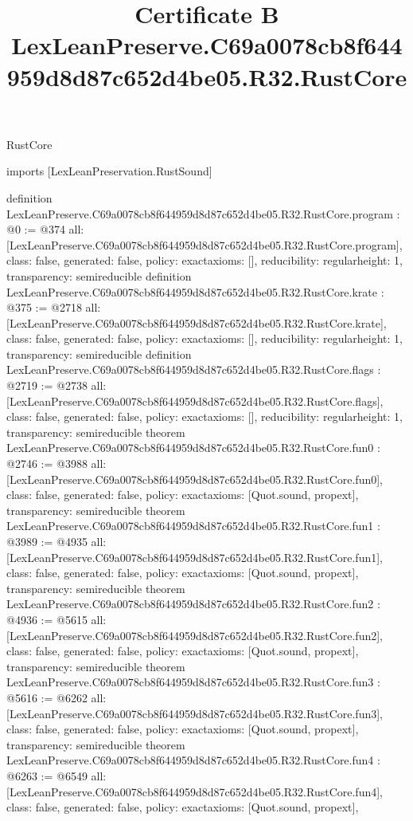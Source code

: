 \begin{lexlean}{RustCore}
\title{Certificate B LexLeanPreserve.C69a0078cb8f644959d8d87c652d4be05.R32.RustCore}
\begin{coremodule}
imports [LexLeanPreservation.RustSound]

definition LexLeanPreserve.C69a0078cb8f644959d8d87c652d4be05.R32.RustCore.program : @0 := @374 {
  all: [LexLeanPreserve.C69a0078cb8f644959d8d87c652d4be05.R32.RustCore.program],
  class: false,
  generated: false,
  policy: exact{axioms: []},
  reducibility: regular{height: 1},
  transparency: semireducible
}
definition LexLeanPreserve.C69a0078cb8f644959d8d87c652d4be05.R32.RustCore.krate : @375 := @2718 {
  all: [LexLeanPreserve.C69a0078cb8f644959d8d87c652d4be05.R32.RustCore.krate],
  class: false,
  generated: false,
  policy: exact{axioms: []},
  reducibility: regular{height: 1},
  transparency: semireducible
}
definition LexLeanPreserve.C69a0078cb8f644959d8d87c652d4be05.R32.RustCore.flags : @2719 := @2738 {
  all: [LexLeanPreserve.C69a0078cb8f644959d8d87c652d4be05.R32.RustCore.flags],
  class: false,
  generated: false,
  policy: exact{axioms: []},
  reducibility: regular{height: 1},
  transparency: semireducible
}
theorem LexLeanPreserve.C69a0078cb8f644959d8d87c652d4be05.R32.RustCore.fun0 : @2746 := @3988 {
  all: [LexLeanPreserve.C69a0078cb8f644959d8d87c652d4be05.R32.RustCore.fun0],
  class: false,
  generated: false,
  policy: exact{axioms: [Quot.sound, propext]},
  transparency: semireducible
}
theorem LexLeanPreserve.C69a0078cb8f644959d8d87c652d4be05.R32.RustCore.fun1 : @3989 := @4935 {
  all: [LexLeanPreserve.C69a0078cb8f644959d8d87c652d4be05.R32.RustCore.fun1],
  class: false,
  generated: false,
  policy: exact{axioms: [Quot.sound, propext]},
  transparency: semireducible
}
theorem LexLeanPreserve.C69a0078cb8f644959d8d87c652d4be05.R32.RustCore.fun2 : @4936 := @5615 {
  all: [LexLeanPreserve.C69a0078cb8f644959d8d87c652d4be05.R32.RustCore.fun2],
  class: false,
  generated: false,
  policy: exact{axioms: [Quot.sound, propext]},
  transparency: semireducible
}
theorem LexLeanPreserve.C69a0078cb8f644959d8d87c652d4be05.R32.RustCore.fun3 : @5616 := @6262 {
  all: [LexLeanPreserve.C69a0078cb8f644959d8d87c652d4be05.R32.RustCore.fun3],
  class: false,
  generated: false,
  policy: exact{axioms: [Quot.sound, propext]},
  transparency: semireducible
}
theorem LexLeanPreserve.C69a0078cb8f644959d8d87c652d4be05.R32.RustCore.fun4 : @6263 := @6549 {
  all: [LexLeanPreserve.C69a0078cb8f644959d8d87c652d4be05.R32.RustCore.fun4],
  class: false,
  generated: false,
  policy: exact{axioms: [Quot.sound, propext]},
}
\end{coremodule}
\end{lexlean}
